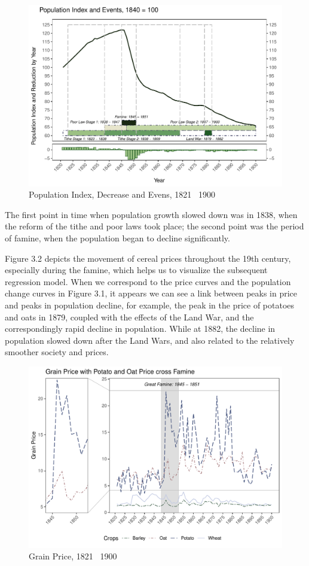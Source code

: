 \begin{figure}[htbp]
    \centering
    \caption{Population Index, Decrease and Evens, 1821 \textendash\ 1900}
    \includegraphics[width=.95\textwidth]{../03_outputs/popline.pdf}
\end{figure}

The first point in time when population growth slowed down was in 1838, when the reform of the tithe and poor laws took place; the second point was the period of famine, when the population began to decline significantly.

Figure 3.2 depicts the movement of cereal prices throughout the 19th century, especially during the famine, which helps us to visualize the subsequent regression model. When we correspond to the price curves and the population change curves in Figure 3.1, it appears we can see a link between peaks in price and peaks in population decline, for example, the peak in the price of potatoes and oats in 1879, coupled with the effects of the Land War, and the correspondingly rapid decline in population. While at 1882, the decline in population slowed down after the Land Wars, and also related to the relatively smoother society and prices.

\begin{figure}[htbp]
    \centering
    \caption{Grain Price, 1821 \textendash\ 1900}
    \includegraphics[width=.95\textwidth]{../03_outputs/grain_price.pdf}
\end{figure}

